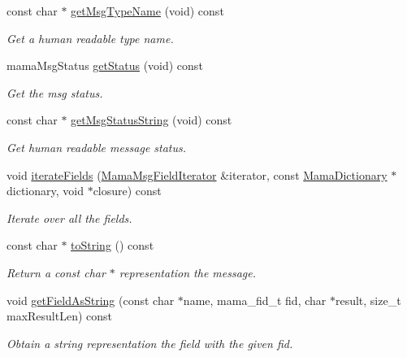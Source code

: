 \begin{DoxyCompactItemize}
const char $\ast$ \hyperlink{classWombat_1_1MamaMsg_a30d10190021418aa54a5e097cdf31717}{getMsgTypeName} (void) const 
\begin{DoxyCompactList}\small\item\em Get a human readable type name. \item\end{DoxyCompactList}\item 
mamaMsgStatus \hyperlink{classWombat_1_1MamaMsg_a8488aaf5b82a3c1419eb1b199d5b1904}{getStatus} (void) const 
\begin{DoxyCompactList}\small\item\em Get the msg status. \item\end{DoxyCompactList}\item 
const char $\ast$ \hyperlink{classWombat_1_1MamaMsg_a9439fc6fd0a23211e00c12afe0b8ecad}{getMsgStatusString} (void) const 
\begin{DoxyCompactList}\small\item\em Get human readable message status. \item\end{DoxyCompactList}\item 
void \hyperlink{classWombat_1_1MamaMsg_acf7d200da9efe6ebddcd3cb4ded0be74}{iterateFields} (\hyperlink{classWombat_1_1MamaMsgFieldIterator}{MamaMsgFieldIterator} \&iterator, const \hyperlink{classWombat_1_1MamaDictionary}{MamaDictionary} $\ast$dictionary, void $\ast$closure) const 
\begin{DoxyCompactList}\small\item\em Iterate over all the fields. \item\end{DoxyCompactList}\item 
const char $\ast$ \hyperlink{classWombat_1_1MamaMsg_ad476d81fb9293df18f6c4509c1b3dab4}{toString} () const 
\begin{DoxyCompactList}\small\item\em Return a const char $\ast$ representation the message. \item\end{DoxyCompactList}\item 
void \hyperlink{classWombat_1_1MamaMsg_a967fd4a558ed5ec369c18718e153f065}{getFieldAsString} (const char $\ast$name, mama\_\-fid\_\-t fid, char $\ast$result, size\_\-t maxResultLen) const 
\begin{DoxyCompactList}\small\item\em Obtain a string representation the field with the given fid. \item\end{DoxyCompactList}\item 

\end{DoxyCompactItemize}
